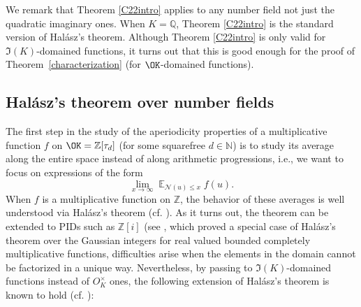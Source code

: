 \documentclass[11pt]{amsart}
\theoremstyle{definition}
\DeclareMathOperator*{\E}{\mathbb{E}}
\newcommand{\N}{{\mathbb N}}
\newcommand{\NN}{{\mathcal N}}
\newcommand{\Q}{{\mathbb Q}}
\newcommand{\Z}{{\mathbb Z}}
\newcommand{\mf}{\mathfrak}
\begin{document}


We remark that Theorem \ref{C22intro} applies to any number field not just the quadratic imaginary ones. When $K=\Q$, Theorem \ref{C22intro} is the standard version of Hal\'asz's theorem.
Although Theorem \ref{C22intro} is only valid for $\mf I(K)$-domained functions, it turns out that this is good enough for the proof of Theorem~\ref{characterization} (for $\OK$-domained functions).







\iffalse  
\subsection{Hal\'asz's theorem over number fields}
The first step in the study of the aperiodicity properties of a multiplicative function $f$ on $\OK=\Z[\tau_{d}]$ (for some squarefree $d\in\N$) is to study its average along the entire space instead of along arithmetic progressions, i.e., we want to focus on expressions of the form
$$\lim_{x\to\infty}\E_{\NN(u)\leq x}f(u).$$
When $f$ is a multiplicative function on $\Z$, the behavior of these averages is well understood via Hal\'asz's theorem (cf. \cite[Satz~1 and Satz~1$'$]{halasz68}). As it turns out, the theorem can be extended to PIDs such as $\Z[i]$ (see \cite[Thoerems A and 1.2]{dlms24}, which proved a special case of Hal\'asz's theorem over the Gaussian integers for real valued bounded completely multiplicative functions, difficulties arise when the elements in the domain cannot be factorized in a unique way. Nevertheless, by passing to $\mf I(K)$-domained functions instead of $O_K^{\times}$ ones, the following extension of Hal\'asz's theorem is known to hold (cf. \cite[Theorem 6.1]{lucht2001}):
\end{document}
